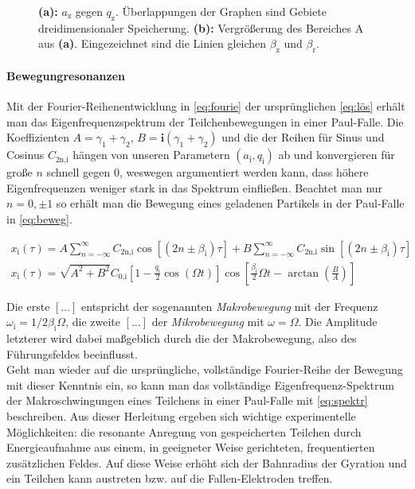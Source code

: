 \documentclass[numbers=noenddot,a4paper,notitlepage,twoside,BCOR15mm]{scrartcl}
\newcommand{\ix}[1]{_\text{#1}}
\newcommand{\imag}{\mathbf{i}}
\newcommand{\tilt}[1]{\textit{#1}}
\newcommand{\fett}[1]{\textbf{#1}}
\begin{document}
\begin{figure}[t]
\begin{subfigure}[t]{0.37\textwidth}
					\caption{}\label{img:stab2}
				\end{subfigure}
				\caption{\fett{(a):} $a\ix{z}$ gegen $q\ix{z}$. Überlappungen der Graphen sind Gebiete dreidimensionaler Speicherung. \fett{(b):} Vergrößerung des Bereiches A aus \fett{(a)}. Eingezeichnet sind die Linien gleichen $\beta\ix{z}$ und $\beta\ix{r}$. }\label{img:stab}
			\end{figure}


			\paragraph{Bewegungresonanzen}

				Mit der Fourier-Reihenentwicklung in \autoref{eq:fourie} der ursprünglichen \autoref{eq:lös} erhält man das Eigenfrequenzspektrum der Teilchenbewegungen in einer Paul-Falle. Die Koeffizienten $A=\gamma\ix{1}+\gamma\ix{2}$, $B=\imag(\gamma\ix{1}+\gamma\ix{2})$ und die der Reihen für Sinus und Cosinus $C\ix{2n,i}$ hängen von unseren Parametern $(a\ix{i},q\ix{i})$ ab und konvergieren für große $n$ schnell gegen 0, weswegen argumentiert werden kann, dass höhere Eigenfrequenzen weniger stark in das Spektrum einfließen. Beachtet man nur $n=0,\pm1$ so erhält man die Bewegung eines geladenen Partikels in der Paul-Falle in \autoref{eq:beweg}.

					\begin{align}
						x\ix{i}(\tau)=A\sum_{n=-\infty}^{\infty}C\ix{2n,i}\cos[(2n\pm\beta\ix{i})\tau]+B\sum_{n=-\infty}^{\infty}C\ix{2n,i}\sin[(2n\pm\beta\ix{i})\tau] \label{eq:fourie} \\
						x\ix{i}(\tau)=\sqrt{A^2+B^2}C\ix{0,i}\left[1-\frac{q\ix{i}}{2}\cos(\Omega t)\right]\cos\left[\frac{\beta\ix{i}}{2}\Omega t-\arctan\left(\frac{B}{A}\right)\right] \label{eq:beweg}
					\end{align}

			Die erste $\left[\dots\right]$ entspricht der sogenannten \tilt{Makrobewegung} mit der Frequenz $\omega\ix{i}=1/2 \beta\ix{i}\Omega$, die zweite $\left[\dots\right]$ der \tilt{Mikrobewegung} mit $\omega=\Omega$. Die Amplitude letzterer wird dabei maßgeblich durch die der Makrobewegung, also des Führungsfeldes beeinflusst.\\
			Geht man wieder auf die ursprüngliche, vollständige Fourier-Reihe der Bewegung mit dieser Kenntnis ein, so kann man das vollständige Eigenfrequenz-Spektrum der Makroschwingungen eines Teilchens in einer Paul-Falle mit \autoref{eq:spektr} beschreiben. Aus dieser Herleitung ergeben sich wichtige experimentelle Möglichkeiten: die resonante Anregung von gespeicherten Teilchen durch Energieaufnahme aus einem, in geeigneter Weise gerichteten, frequentierten zusätzlichen Feldes. Auf diese Weise erhöht sich der Bahnradius der Gyration und ein Teilchen kann austreten bzw. auf die Fallen-Elektroden treffen.
\end{document}
